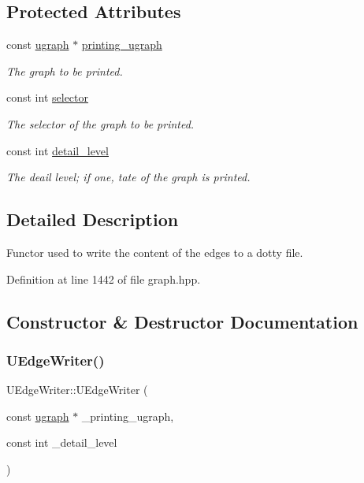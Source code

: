 \subsection*{Protected Attributes}
\begin{DoxyCompactItemize}
\item 
const \hyperlink{structugraph}{ugraph} $\ast$ \hyperlink{classUEdgeWriter_af3bc21358e854da6c8209300005500ed}{printing\+\_\+ugraph}
\begin{DoxyCompactList}\small\item\em The graph to be printed. \end{DoxyCompactList}\item 
const int \hyperlink{classUEdgeWriter_a7c77dc5d5d0d3a35e892532f052a101c}{selector}
\begin{DoxyCompactList}\small\item\em The selector of the graph to be printed. \end{DoxyCompactList}\item 
const int \hyperlink{classUEdgeWriter_a9fc4820dfb29beead02b831d1210119e}{detail\+\_\+level}
\begin{DoxyCompactList}\small\item\em The deail level; if one, tate of the graph is printed. \end{DoxyCompactList}\end{DoxyCompactItemize}


\subsection{Detailed Description}
Functor used to write the content of the edges to a dotty file. 

Definition at line 1442 of file graph.\+hpp.



\subsection{Constructor \& Destructor Documentation}
\mbox{\label{classUEdgeWriter_a9fa7b65468e27e7f6335ec966f4f8fc9}} 
\subsubsection{\texorpdfstring{U\+Edge\+Writer()}{UEdgeWriter()}}
{\footnotesize\ttfamily U\+Edge\+Writer\+::\+U\+Edge\+Writer (\begin{DoxyParamCaption}\item[{const \hyperlink{structugraph}{ugraph} $\ast$}]{\+\_\+printing\+\_\+ugraph,  }\item[{const int}]{\+\_\+detail\+\_\+level }\end{DoxyParamCaption})\hspace{0.3cm}{\ttfamily [inline]}}



